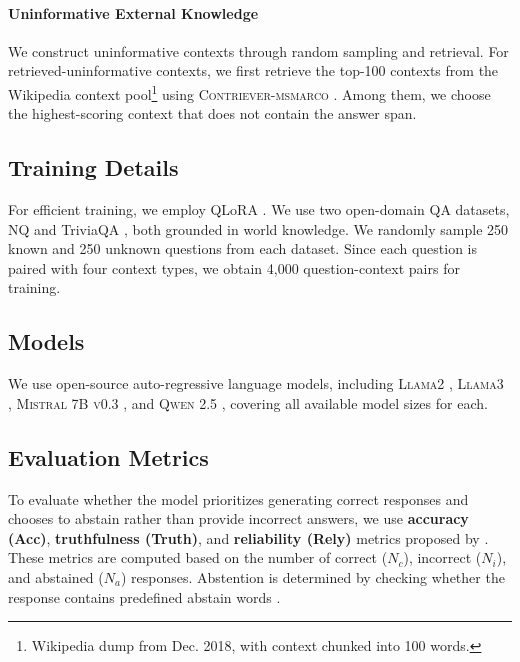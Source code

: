 \paragraph{Uninformative External Knowledge} 
\label{dataset:uninformative-external}

We construct uninformative contexts through random sampling and retrieval.
For retrieved-uninformative contexts, we first retrieve the top-100 contexts from the Wikipedia context pool\footnote{Wikipedia dump from Dec. 2018, with context chunked into 100 words.} using {\scshape Contriever-msmarco} \citep{izacard2022unsupervised}.
Among them, we choose the highest-scoring context that does not contain the answer span.






\subsection{Training Details}

For efficient training, we employ QLoRA \citep{dettmers2023qlora}.
We use two open-domain QA datasets, NQ \citep{kwiatkowski-etal-2019-natural} and TriviaQA \citep{joshi2017triviaqalargescaledistantly}, both grounded in world knowledge.
We randomly sample 250 known and 250 unknown questions from each dataset.
Since each question is paired with four context types, we obtain 4,000 question-context pairs for training.



\subsection{Models}

We use open-source auto-regressive language models, including {\scshape Llama2} \citep{touvron2023llama}, {\scshape Llama3} \citep{grattafiori2024llama3herdmodels}, {\scshape Mistral 7B v0.3} \citep{jiang2023mistral}, and {\scshape Qwen 2.5} \citep{qwen2.5}, covering all available model sizes for each.



\subsection{Evaluation Metrics}

To evaluate whether the model prioritizes generating correct responses and chooses to abstain rather than provide incorrect answers, we use \textbf{accuracy (Acc)}, \textbf{truthfulness (Truth)}, and \textbf{reliability (Rely)} metrics proposed by \citet{xu2024rejection}.
These metrics are computed based on the number of correct ($N_c$), incorrect ($N_i$), and abstained ($N_a$) responses. 
Abstention is determined by checking whether the response contains predefined abstain words \citep{amayuelas-etal-2024-knowledge}.

